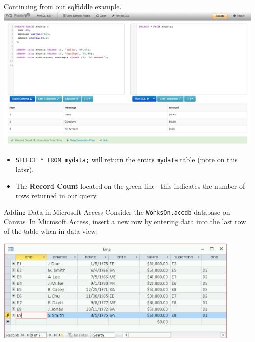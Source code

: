 \documentclass[xcolor=svgnames]{beamer}
\theoremstyle{example}
\begin{document}
\begin{frame}
Continuing from our  \href{http://sqlfiddle.com/\#!9/d8ad4/3}{sqlfiddle} example.
\includegraphics[width=1.01\textwidth]{img/SQLfiddle.png}\\
\begin{itemize}
\item {\tt SELECT * FROM mydata;} will return the entire {\tt mydata} table (more on this later). 
\item The {\bf Record Count} located on the green line-- this indicates the number of rows returned in our query.
\end{itemize}
\end{frame}



\begin{frame}{Adding Data in Microsoft Access }
Consider the  {\tt WorksOn.accdb}  database on Canvas. In Microsoft Access, insert a new row by entering data into the last row of the table when in data view.
\begin{center}
\includegraphics[width=0.9\textwidth]{img/insert}
\end{center}

\end{frame}
\end{document}
